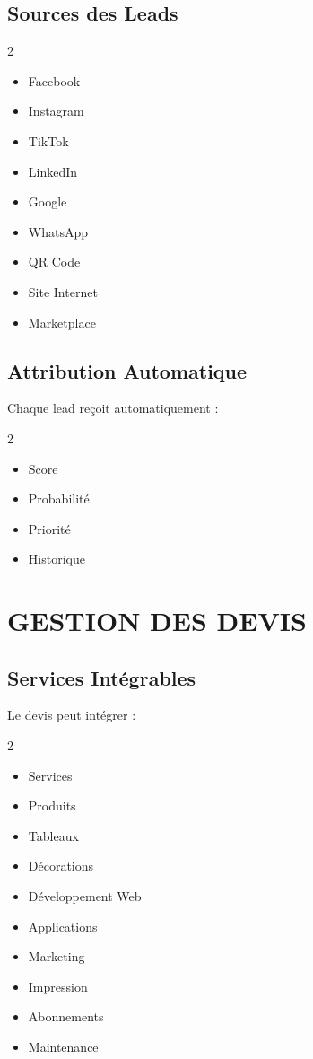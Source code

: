 \documentclass[12pt,a4paper,oneside]{book}
\begin{document}
\section{Sources des Leads}
\begin{multicols}{2}
\begin{itemize}
\item Facebook
\item Instagram
\item TikTok
\item LinkedIn
\item Google
\item WhatsApp
\item QR Code
\item Site Internet
\item Marketplace
\end{itemize}
\end{multicols}

\section{Attribution Automatique}
Chaque lead reçoit automatiquement :
\begin{multicols}{2}
\begin{itemize}
\item Score
\item Probabilité
\item Priorité
\item Historique
\end{itemize}
\end{multicols}

\chapter{GESTION DES DEVIS}

\section{Services Intégrables}
Le devis peut intégrer :
\begin{multicols}{2}
\begin{itemize}
\item Services
\item Produits
\item Tableaux
\item Décorations
\item Développement Web
\item Applications
\item Marketing
\item Impression
\item Abonnements
\item Maintenance
\end{itemize}
\end{multicols}
\end{document}
